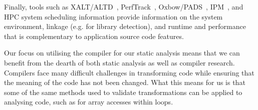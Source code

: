 Finally, tools such as XALT/ALTD~\cite{xalt,xalt2}, PerfTrack~\cite{Karavanic:2005:IDT:1105760.1105804}, Oxbow/PADS~\cite{oxbowpads}, IPM~\cite{5695625}, and \acs{HPC} system scheduling information provide information on the system environment, linkage (e.g. for library detection), and runtime and performance that is complementary to application source code features.

Our focus on utilising the compiler for our static analysis means that we can benefit from the dearth of both static analysis as well as compiler research.
Compilers face many difficult challenges in transforming code while ensuring that the meaning of the code has not been changed.
What this means for us is that some of the same methods used to validate transformations can be applied to analysing code, such as for array accesses within loops.
